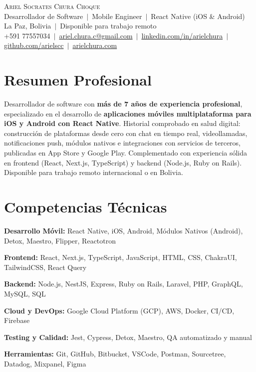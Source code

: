 \documentclass[letterpaper,10.5pt]{article}
\begin{document}
\begin{center}
    {\Huge \scshape \color{primary} Ariel Socrates Chura Choque} \\ \vspace{4pt}
    {\large Desarrollador de Software \,$|$\, Mobile Engineer \,$|$\, React Native (iOS \& Android)} \\ \vspace{5pt}
    \small
    La Paz, Bolivia \,$|$\, Disponible para trabajo remoto \\ \vspace{2pt}
    +591 77557034 \,$|$\,
    \href{mailto:ariel.chura.c@gmail.com}{ariel.chura.c@gmail.com} \,$|$\,
    \href{https://www.linkedin.com/in/arielchura}{linkedin.com/in/arielchura} \,$|$\,
    \href{https://github.com/arielscc}{github.com/arielscc} \,$|$\,
    \href{https://arielchura.com}{arielchura.com}
\end{center}

\section{Resumen Profesional}
\small{
Desarrollador de software con \textbf{más de 7 años de experiencia profesional}, especializado en el desarrollo de \textbf{aplicaciones móviles multiplataforma para iOS y Android con React Native}. Historial comprobado en salud digital: construcción de plataformas desde cero con chat en tiempo real, videollamadas, notificaciones push, módulos nativos e integraciones con servicios de terceros, publicadas en App Store y Google Play. Complementado con experiencia sólida en frontend (React, Next.js, TypeScript) y backend (Node.js, Ruby on Rails). Disponible para trabajo remoto internacional o en Bolivia.
}

\section{Competencias Técnicas}
\begin{itemize}[leftmargin=0.15in, label={}, itemsep=0pt]
    \small{
    \item \textbf{Desarrollo Móvil:} React Native, iOS, Android, Módulos Nativos (Android), Detox, Maestro, Flipper, Reactotron
    \item \textbf{Frontend:} React, Next.js, TypeScript, JavaScript, HTML, CSS, ChakraUI, TailwindCSS, React Query
    \item \textbf{Backend:} Node.js, NestJS, Express, Ruby on Rails, Laravel, PHP, GraphQL, MySQL, SQL
    \item \textbf{Cloud y DevOps:} Google Cloud Platform (GCP), AWS, Docker, CI/CD, Firebase
    \item \textbf{Testing y Calidad:} Jest, Cypress, Detox, Maestro, QA automatizado y manual
    \item \textbf{Herramientas:} Git, GitHub, Bitbucket, VSCode, Postman, Sourcetree, Datadog, Mixpanel, Figma
    }
\end{itemize}
\end{document}
